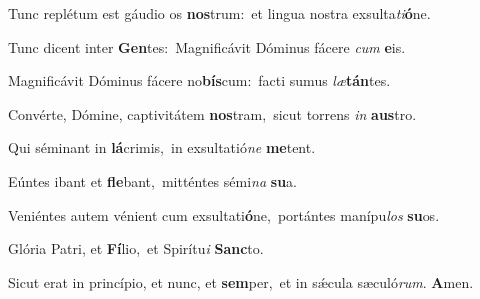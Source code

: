 Tunc replétum est gáudio os \textbf{nos}trum:~\redgreheightstar et lingua nostra exsulta\textit{ti}\textbf{ó}ne.

Tunc dicent inter \textbf{Gen}tes:~\redgreheightstar Magnificávit Dóminus fácere \textit{cum} \textbf{e}is.

Magnificávit Dóminus fácere no\textbf{bís}cum:~\redgreheightstar facti sumus \textit{læ}\textbf{tán}tes.

Convérte, Dómine, captivitátem \textbf{nos}tram,~\redgreheightstar sicut torrens \textit{in} \textbf{aus}tro.

Qui séminant in \textbf{lá}crimis,~\redgreheightstar in exsultatió\textit{ne} \textbf{me}tent.

Eúntes ibant et \textbf{fle}bant,~\redgreheightstar mitténtes sémi\textit{na} \textbf{su}a.

Veniéntes autem vénient cum exsultati\textbf{ó}ne,~\redgreheightstar portántes manípu\textit{los} \textbf{su}os.

Glória Patri, et \textbf{Fí}lio,~\redgreheightstar et Spirítu\textit{i} \textbf{Sanc}to.

Sicut erat in princípio, et nunc, et \textbf{sem}per,~\redgreheightstar et in sǽcula sæculó\textit{rum}. \textbf{A}men.

